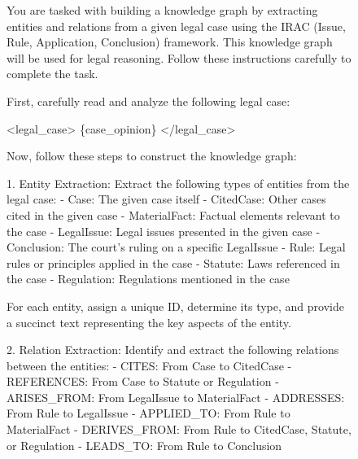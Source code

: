 \begin{figure}[htbp]
\begin{tcolorbox}[enhanced,colback=orange!5!white,colframe=orange!75!black,title=Prompt for Generating IRAC KG (Part I)]

\raggedright

You are tasked with building a knowledge graph by extracting entities and relations from a given legal case using the IRAC (Issue, Rule, Application, Conclusion) framework. This knowledge graph will be used for legal reasoning. Follow these instructions carefully to complete the task.\newline

First, carefully read and analyze the following legal case:\newline

<legal\_case>\newline
\{case\_opinion\}\newline
</legal\_case>\newline

Now, follow these steps to construct the knowledge graph:\newline

1. Entity Extraction:\newline
Extract the following types of entities from the legal case:\newline
- Case: The given case itself\newline
- CitedCase: Other cases cited in the given case\newline
- MaterialFact: Factual elements relevant to the case\newline
- LegalIssue: Legal issues presented in the given case\newline
- Conclusion: The court's ruling on a specific LegalIssue\newline
- Rule: Legal rules or principles applied in the case\newline
- Statute: Laws referenced in the case\newline
- Regulation: Regulations mentioned in the case\newline

For each entity, assign a unique ID, determine its type, and provide a succinct text representing the key aspects of the entity.\newline

2. Relation Extraction:\newline
Identify and extract the following relations between the entities:\newline
- CITES: From Case to CitedCase\newline
- REFERENCES: From Case to Statute or Regulation\newline
- ARISES\_FROM: From LegalIssue to MaterialFact\newline
- ADDRESSES: From Rule to LegalIssue\newline
- APPLIED\_TO: From Rule to MaterialFact\newline
- DERIVES\_FROM: From Rule to CitedCase, Statute, or Regulation\newline
- LEADS\_TO: From Rule to Conclusion\newline


\end{tcolorbox}
\end{figure}
